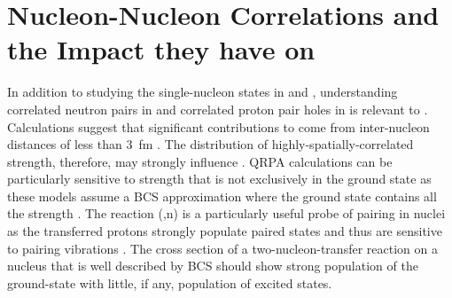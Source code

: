 \section{Nucleon-Nucleon Correlations and the Impact they have on \NME}
\label{sec:correlations}

In addition to studying the single-nucleon states in \GeTargets and \SeProducts, understanding correlated neutron pairs in  and correlated proton pair holes in  is relevant to \NME.  Calculations suggest that significant contributions to \NME come from inter-nucleon distances of less than 3~fm \citep{anatomy}.  The distribution of highly-spatially-correlated \zp strength, therefore, may strongly influence \NME.  QRPA calculations can be particularly sensitive to \zp strength that is not exclusively in the ground state as these models assume a BCS approximation where the ground state contains all the \zp strength \citep{BenderSCMF}.  The reaction (,n) is a particularly useful probe of pairing in nuclei as the transferred protons strongly populate paired states and thus are sensitive to pairing vibrations \citep{Yoshida}.  The cross section of a two-nucleon-transfer reaction on a nucleus that is well described by BCS should show strong population of the \zp ground-state with little, if any, population of \zp excited states.  

